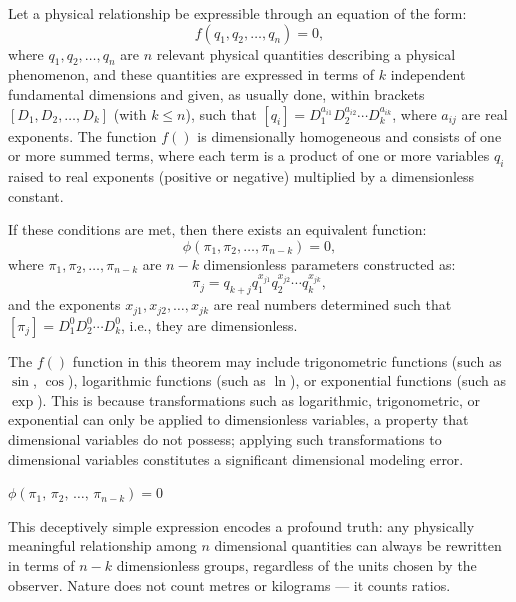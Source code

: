 \begin{theorem}
\label{thm:buckingham}
Let a physical relationship be expressible through an equation of the form:
\begin{equation}
f(q_1,q_2,\ldots,q_n) = 0,
\label{eq:physicalrelation}
\end{equation}
where $q_1,q_2,\ldots,q_n$ are $n$ relevant physical quantities describing a physical phenomenon, and these quantities are expressed in terms of $k$ independent fundamental dimensions and given, as usually done, within brackets $[D_1,D_2,\ldots,D_k]$ (with $k \leq n$), such that $[q_i] = D_1^{a_{i1}} D_2^{a_{i2}} \cdots D_k^{a_{ik}}$, where $a_{ij}$ are real exponents. The function $f()$ is dimensionally homogeneous and consists of one or more summed terms, where each term is a product of one or more variables $q_i$ raised to real exponents (positive or negative) multiplied by a dimensionless constant.

If these conditions are met, then there exists an equivalent function:
\begin{equation}
\phi(\pi_1,\pi_2,\ldots,\pi_{n-k}) = 0,
\end{equation}
where $\pi_1,\pi_2,\ldots,\pi_{n-k}$ are $n-k$ dimensionless parameters constructed as:
\begin{equation}
\pi_j = q_{k+j}q_1^{x_{j1}}q_2^{x_{j2}}\cdots q_k^{x_{jk}},
\end{equation}
and the exponents $x_{j1}, x_{j2},\ldots, x_{jk}$ are real numbers determined such that $[\pi_j] = D_1^0D_2^0\cdots D_k^0$, i.e., they are dimensionless.
\end{theorem}


\begin{remarkbox}
\begin{remarkT}
The $f()$ function in this theorem may include trigonometric functions (such as $\sin$, $\cos$), logarithmic functions (such as $\ln$), or exponential functions (such as $\exp$). This is because transformations such as logarithmic, trigonometric, or exponential can only be applied to dimensionless variables, a property that dimensional variables do not possess; applying such transformations to dimensional variables constitutes a significant dimensional modeling error.
\end{remarkT}
\end{remarkbox}

\begin{tcolorbox}[colback=blue!3!white, colframe=blue!40!black,
  title={\centering The universal equation}, fonttitle=\bfseries]
\begin{center}
\Large $\phi(\pi_1,\,\pi_2,\,\ldots,\,\pi_{n-k}) = 0$
\end{center}
\medskip
This deceptively simple expression encodes a profound truth: any physically meaningful relationship among $n$ dimensional quantities can always be rewritten in terms of $n-k$ dimensionless groups, regardless of the units chosen by the observer. Nature does not count metres or kilograms — it counts ratios.
\end{tcolorbox}

